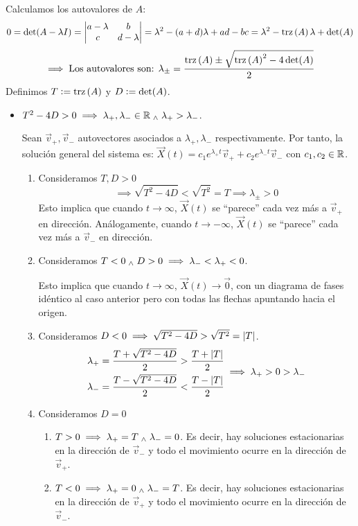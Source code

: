 Calculamos los autovalores de $A$:
\[0= \det (A - \lambda I) = \begin{vmatrix}
		a-\lambda & b         \\
		c         & d-\lambda
	\end{vmatrix} = \lambda^2 - (a+d)\lambda + ad - bc = \lambda^2 - \operatorname{trz}\left(A\right) \lambda + \det(A)\]
\[\implies \text{Los autovalores son: } \lambda_{\pm} = \frac{\operatorname{trz}\left(A\right) \pm \sqrt{\operatorname{trz}\left(A\right)^2 - 4\det(A)}}{2}\]
Definimos $T\vcentcolon= \operatorname{trz}\left(A\right)$ y $D\vcentcolon= \det(A)$. %
\begin{itemize}
	\item {} $T^2 - 4D > 0 \implies \lambda_+, \lambda_- \in \mathbb{R} \; _{\wedge} \; \lambda_+ > \lambda_-$.

	      Sean $\vec{v}_+, \vec{v}_-$ autovectores asociados a $\lambda_+, \lambda_-$ respectivamente. Por tanto, la solución general del sistema es: $\vec{X}(t) = c_1 e^{\lambda_+ t} \vec{v}_+ + c_2 e^{\lambda_- t} \vec{v}_-$ con $c_1, c_2 \in \mathbb{R}$.
	      \begin{enumerate}
		      \item Consideramos $T, D > 0$
		            \[\implies \sqrt{T^2 - 4D} < \sqrt{T^2} = T \implies \lambda_{\pm} > 0\]
		            Esto implica que cuando $t\to \infty$, $\vec{X}(t)$ se ``parece'' cada vez más a $\vec{v}_+$ en dirección. Análogamente, cuando $t\to -\infty$, $\vec{X}(t)$ se ``parece'' cada vez más a $\vec{v}_-$ en dirección.
		      \item Consideramos $T < 0 \; _{\wedge} \; D > 0 \implies \lambda_- < \lambda_+ < 0$.

		            Esto implica que cuando $t\to \infty$, $\vec{X}(t) \to \vec{0}$, con un diagrama de fases idéntico al caso anterior pero con todas las flechas apuntando hacia el origen.
		      \item Consideramos $D < 0 \implies \sqrt{T^2 - 4D} > \sqrt{T^2} = \left|T\right|$.
		            \[\begin{aligned}
				            \lambda_+ & = \frac{T + \sqrt{T^2 - 4D}}{2} > \frac{T + \left|T\right|}{2} \\
				            \lambda_- & = \frac{T - \sqrt{T^2 - 4D}}{2} < \frac{T - \left|T\right|}{2}
			            \end{aligned} \implies \lambda_+ > 0 > \lambda_-\]
		      \item Consideramos $D = 0$
		            \begin{enumerate}
			            \item $T > 0 \implies \lambda_+ = T \; _{\wedge} \; \lambda_- = 0$. Es decir, hay soluciones estacionarias en la dirección de $\vec{v}_-$ y todo el movimiento ocurre en la dirección de $\vec{v}_+$.
			            \item $T < 0 \implies \lambda_+ = 0 \; _{\wedge} \; \lambda_- = T$. Es decir, hay soluciones estacionarias en la dirección de $\vec{v}_+$ y todo el movimiento ocurre en la dirección de $\vec{v}_-$.
		            \end{enumerate}


\end{enumerate}
\end{itemize}
